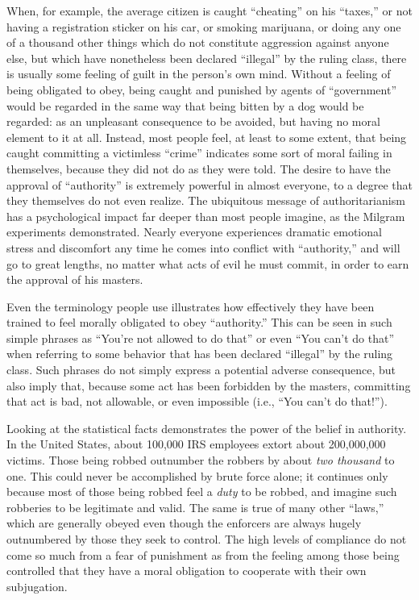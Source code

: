 \documentclass{book}
\begin{document}
When, for example, the average citizen is caught \enquote{cheating} on his \enquote{taxes,} or not having a registration sticker on his car, or smoking marijuana, or doing any one of a thousand other things which do not constitute aggression against anyone else, but which have nonetheless been declared \enquote{illegal} by the ruling class, there is usually some feeling of guilt in the person's own mind. Without a feeling of being obligated to obey, being caught and punished by agents of \enquote{government} would be regarded in the same way that being bitten by a dog would be regarded: as an unpleasant consequence to be avoided, but having no moral element to it at all. Instead, most people feel, at least to some extent, that being caught committing a victimless \enquote{crime} indicates some sort of moral failing in themselves, because they did not do as they were told. The desire to have the approval of \enquote{authority} is extremely powerful in almost everyone, to a degree that they themselves do not even realize. The ubiquitous message of authoritarianism has a psychological impact far deeper than most people imagine, as the Milgram experiments demonstrated. Nearly everyone experiences dramatic emotional stress and discomfort any time he comes into conflict with \enquote{authority,} and will go to great lengths, no matter what acts of evil he must commit, in order to earn the approval of his masters.

Even the terminology people use illustrates how effectively they have been trained to feel morally obligated to obey \enquote{authority.} This can be seen in such simple phrases as \enquote{You're not allowed to do that} or even \enquote{You can't do that} when referring to some behavior that has been declared \enquote{illegal} by the ruling class. Such phrases do not simply express a potential adverse consequence, but also imply that, because some act has been forbidden by the masters, committing that act is bad, not allowable, or even impossible (i.e., \enquote{You can't do that!}).

Looking at the statistical facts demonstrates the power of the belief in authority. In the United States, about 100,000 IRS employees extort about 200,000,000 victims. Those being robbed outnumber the robbers by about \emph{two thousand} to one. This could never be accomplished by brute force alone; it continues only because most of those being robbed feel a \emph{duty} to be robbed, and imagine such robberies to be legitimate and valid. The same is true of many other \enquote{laws,} which are generally obeyed even though the enforcers are always hugely outnumbered by those they seek to control. The high levels of compliance do not come so much from a fear of punishment as from the feeling among those being controlled that they have a moral obligation to cooperate with their own subjugation.
\end{document}
